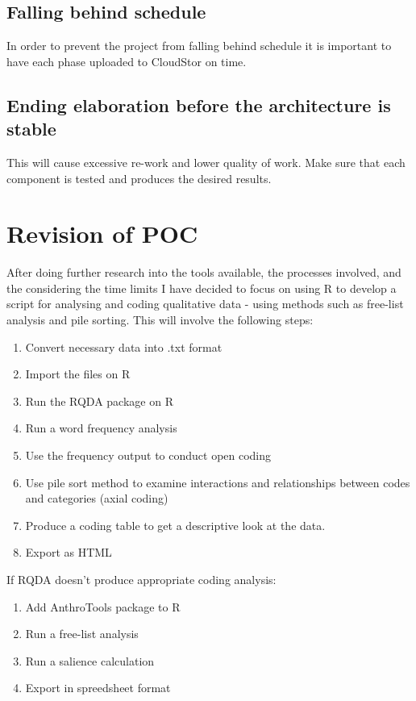 \documentclass{article}
\begin{document}
\subsection{Falling behind schedule}
In order to prevent the project from falling behind schedule it is important to have each phase uploaded to CloudStor on time.

\subsection{Ending elaboration before the architecture is stable}
This will cause excessive re-work and lower quality of work. Make sure that each component is tested and produces the desired results.

\section{Revision of POC}
After doing further research into the tools available, the processes involved, and the considering the time limits I have decided to focus on using R to develop a script for analysing and coding qualitative data - using methods such as free-list analysis and pile sorting. This will involve the following steps:
\begin{enumerate}
    \item Convert necessary data into .txt format
    \item Import the files on R 
    \item Run the RQDA package on R 
    \item Run a word frequency analysis
    \item Use the frequency output to conduct open coding
    \item Use pile sort method to examine interactions and relationships between codes and categories (axial coding)
    \item Produce a coding table to get a descriptive look at the data.
    \item Export as HTML
\end{enumerate}
If RQDA doesn't produce appropriate coding analysis:
\begin{enumerate}
    \item Add AnthroTools package to R \item Run a free-list analysis
    \item Run a salience calculation 
    \item Export in spreedsheet format
\end{enumerate}
\end{document}
